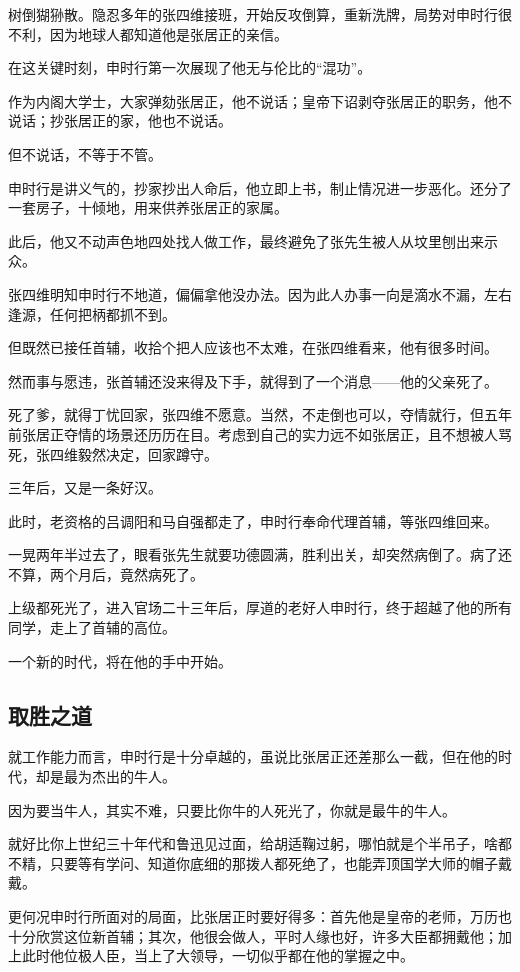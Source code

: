 \begin{multicols}{\theparacolNo}
		树倒猢狲散。隐忍多年的张四维接班，开始反攻倒算，重新洗牌，局势对申时行很不利，因为地球人都知道他是张居正的亲信。

		在这关键时刻，申时行第一次展现了他无与伦比的“混功”。

		作为内阁大学士，大家弹劾张居正，他不说话；皇帝下诏剥夺张居正的职务，他不说话；抄张居正的家，他也不说话。

		但不说话，不等于不管。

		申时行是讲义气的，抄家抄出人命后，他立即上书，制止情况进一步恶化。还分了一套房子，十倾地，用来供养张居正的家属。

		此后，他又不动声色地四处找人做工作，最终避免了张先生被人从坟里刨出来示众。

		张四维明知申时行不地道，偏偏拿他没办法。因为此人办事一向是滴水不漏，左右逢源，任何把柄都抓不到。

		但既然已接任首辅，收拾个把人应该也不太难，在张四维看来，他有很多时间。

		然而事与愿违，张首辅还没来得及下手，就得到了一个消息——他的父亲死了。

		死了爹，就得丁忧回家，张四维不愿意。当然，不走倒也可以，夺情就行，但五年前张居正夺情的场景还历历在目。考虑到自己的实力远不如张居正，且不想被人骂死，张四维毅然决定，回家蹲守。

		三年后，又是一条好汉。

		此时，老资格的吕调阳和马自强都走了，申时行奉命代理首辅，等张四维回来。

		一晃两年半过去了，眼看张先生就要功德圆满，胜利出关，却突然病倒了。病了还不算，两个月后，竟然病死了。

		上级都死光了，进入官场二十三年后，厚道的老好人申时行，终于超越了他的所有同学，走上了首辅的高位。

		一个新的时代，将在他的手中开始。

		\subsection{取胜之道}
		就工作能力而言，申时行是十分卓越的，虽说比张居正还差那么一截，但在他的时代，却是最为杰出的牛人。

		因为要当牛人，其实不难，只要比你牛的人死光了，你就是最牛的牛人。

		就好比你上世纪三十年代和鲁迅见过面，给胡适鞠过躬，哪怕就是个半吊子，啥都不精，只要等有学问、知道你底细的那拨人都死绝了，也能弄顶国学大师的帽子戴戴。

		更何况申时行所面对的局面，比张居正时要好得多：首先他是皇帝的老师，万历也十分欣赏这位新首辅；其次，他很会做人，平时人缘也好，许多大臣都拥戴他；加上此时他位极人臣，当上了大领导，一切似乎都在他的掌握之中。


\end{multicols}
